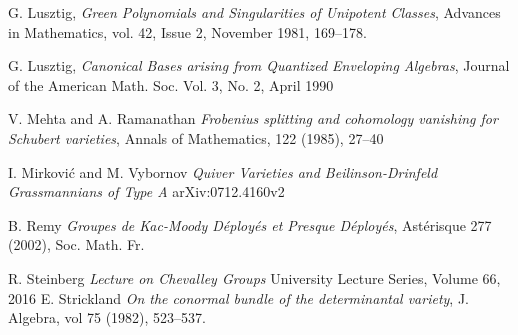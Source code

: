 \documentclass[paper=a4, fontsize=10pt]{amsart} %
\theoremstyle{plain}
\theoremstyle{definition}
\theoremstyle{remark}
\numberwithin{equation}{section} %
\numberwithin{figure}{section} %
\numberwithin{table}{section} %
\numberwithin{subsection}{section} %
\begin{document}
\begin{thebibliography}{1}
 G. Lusztig, {\it Green Polynomials and Singularities of Unipotent Classes}, Advances in Mathematics, vol. 42, Issue 2, November 1981, 169--178.

 G. Lusztig, {\it Canonical Bases arising from Quantized Enveloping Algebras}, Journal of the American Math. Soc. Vol. 3, No. 2, April 1990

 V. Mehta and A. Ramanathan {\em Frobenius splitting and cohomology vanishing for Schubert varieties}, Annals of Mathematics, 122 (1985), 27--40

 I. Mirkovi\'c and M. Vybornov {\em Quiver Varieties and Beilinson-Drinfeld Grassmannians of Type A} arXiv:0712.4160v2

 B. Remy {\em Groupes de Kac-Moody D\'eploy\'es et Presque D\'eploy\'es}, Ast\'erisque 277 (2002), Soc. Math. Fr.

 R. Steinberg {\em Lecture on Chevalley Groups} University Lecture Series, Volume 66, 2016
 E. Strickland {\em On the conormal bundle of the determinantal variety}, J. Algebra, vol 75 (1982), 523--537.

\end{thebibliography}
\endgroup
\end{document}
